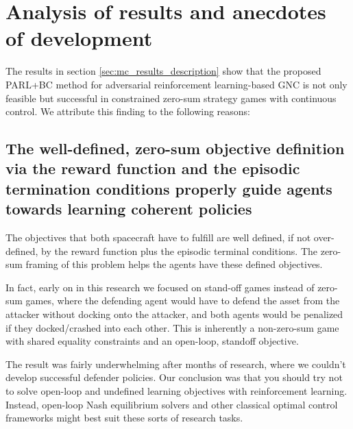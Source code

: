 

\section{Analysis of results and anecdotes of development}
\label{sec:analysis-and-anecdotes}

The results in section \ref{sec:mc_results_description} show that the proposed PARL+BC method for adversarial reinforcement learning-based GNC is not only feasible but successful in constrained zero-sum strategy games with continuous control. We attribute this finding to the following reasons:

\subsection*{The well-defined, zero-sum objective definition via the reward function and the episodic termination conditions properly guide agents towards learning coherent policies}

The objectives that both spacecraft have to fulfill are well defined, if not over-defined, by the reward function plus the episodic terminal conditions. The zero-sum framing of this problem helps the agents have these defined objectives.
    
In fact, early on in this research we focused on stand-off games instead of zero-sum games, where the defending agent would have to defend the asset from the attacker without docking onto the attacker, and both agents would be penalized if they docked/crashed into each other. This is inherently a non-zero-sum game with shared equality constraints and an open-loop, standoff objective.

The result was fairly underwhelming after months of research, where we couldn't develop successful defender policies. Our conclusion was that you should try not to solve open-loop and undefined learning objectives with reinforcement learning. Instead, open-loop Nash equilibrium solvers and other classical optimal control frameworks might best suit these sorts of research tasks.

